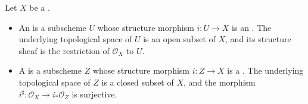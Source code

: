 \begin{definition} \label{definition:open_and_closed_subscheme_of_a_scheme}
Let $X$ be a .
\begin{itemize}
    \item An  is a subscheme $U$ whose structure morphism $i: U \to X$ is an . The underlying topological space of $U$ is an open subset of $X$, and its structure sheaf is the restriction of $\mathcal{O}_X$ to $U$.
    \item A  is a subscheme $Z$ whose structure morphism $i: Z \to X$ is a . The underlying topological space of $Z$ is a closed subset of $X$, and the morphism $i^\sharp: \mathcal{O}_X \to i_* \mathcal{O}_Z$ is surjective.
\end{itemize}
\end{definition}